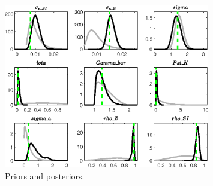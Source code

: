  
\begin{figure}[H]
\centering
\includegraphics[width=0.80\textwidth]{two_sector_RBC_differentiated_est/Output/two_sector_RBC_differentiated_est_PriorsAndPosteriors1}
\caption{Priors and posteriors.}\label{Fig:PriorsAndPosteriors:1}
\end{figure}
 
